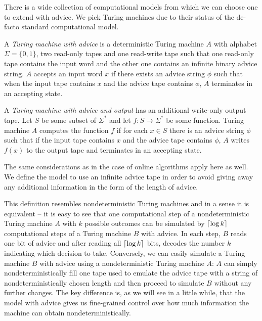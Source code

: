 There is a wide collection of computational models from which we can
choose one to extend with advice. We pick Turing machines due to their
status of the de-facto standard computational model.

\begin{definition}\label{definition:turing-advice}
    A \emph{Turing machine with advice} is a deterministic Turing machine
    $A$ with alphabet $\Sigma = \{0,1\}$, two read-only tapes and one
    read-write tape such that one read-only tape contains the input word
    and the other one contains an infinite binary advice string. $A$
    accepts an input word $x$ if there exists an advice string $\phi$ such
    that when the input tape contains $x$ and the advice tape contains
    $\phi$, $A$ terminates in an accepting state.

    A \emph{Turing machine with advice and output} has an additional
    write-only output tape. Let $S$ be some subset of $\Sigma^*$ and let
    $f: S \to \Sigma^*$ be some function. Turing machine $A$ computes the
    function $f$ if for each $x \in S$ there is an advice string $\phi$
    such that if the input tape contains $x$ and the advice tape contains
    $\phi$, $A$ writes $f(x)$ to the output tape and terminates in an
    accepting state.
\end{definition}

The same considerations as in the case of online algorithms apply here as
well. We define the model to use an infinite advice tape in order to avoid
giving away any additional information in the form of the length of
advice.

This definition resembles nondeterministic Turing machines and in a sense
it is equivalent -- it is easy to see that one computational step of a
nondeterministic Turing machine $A$ with $k$ possible outcomes can be
simulated by $\lceil\log{}k\rceil$ computational steps of a Turing machine $B$
with advice. In each step, $B$ reads one bit of advice and after reading
all $\lceil\log{}k\rceil$ bits, decodes the number $k$ indicating which
decision to take. Conversely, we can easily simulate a Turing machine $B$ with
advice using a nondeterministic Turing machine $A$: $A$ can simply
nondeterministically fill one tape used to emulate the advice tape with a
string of nondeterministically chosen length and then proceed to simulate
$B$ without any further changes. The key difference is, as we will see in
a little while, that the model with advice gives us fine-grained control
over how much information the machine can obtain nondeterministically.

